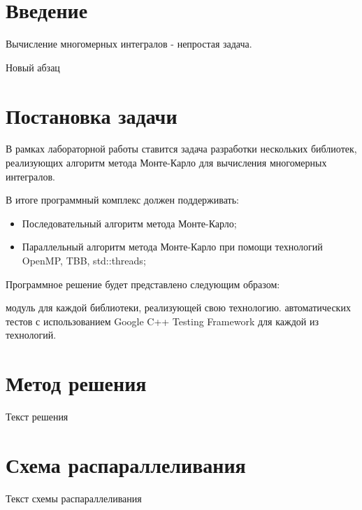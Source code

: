 \documentclass{report}
\begin{document}
\setcounter{page}{2}

\tableofcontents
\newpage

\section*{Введение}
\indent\par Вычисление многомерных интегралов - непростая задача.
\par Новый абзац
\newpage

\section*{Постановка задачи}
\indent\par В рамках лабораторной работы ставится задача разработки нескольких библиотек, реализующих алгоритм метода Монте-Карло для вычисления многомерных интегралов.
\par В итоге программный комплекс должен поддерживать:
\begin{itemize}
\item Последовательный алгоритм метода Монте-Карло;
\item Параллельный алгоритм метода Монте-Карло при помощи технологий OpenMP, TBB, std::threads;
\end{itemize}
\par Программное решение будет представлено следующим образом:
\begin{enumerate} 
 модуль для каждой библиотеки, реализующей свою технологию.
 автоматических тестов с использованием Google C++ Testing Framework для каждой из технологий.
\end{enumerate} 

\newpage

\section*{Метод решения}
Текст решения
\newpage

\section*{Схема распараллеливания}
Текст схемы распараллеливания
\newpage
\end{document}
